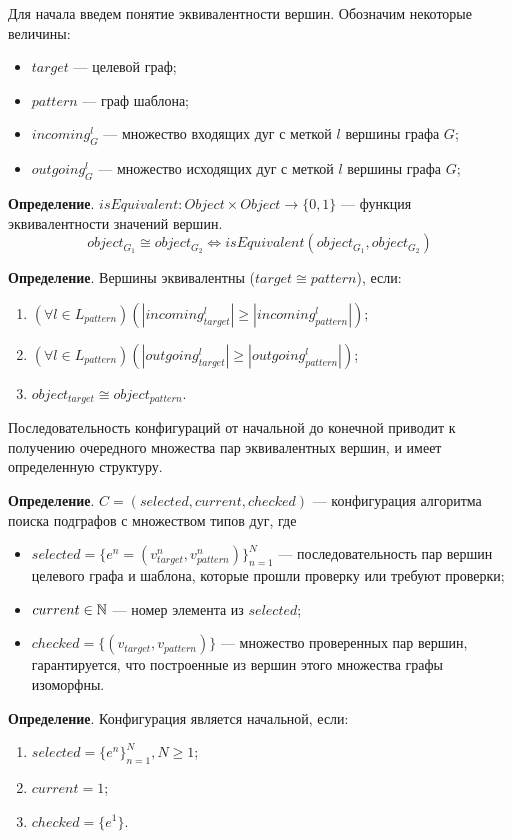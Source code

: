 Для начала введем понятие эквивалентности вершин.
Обозначим некоторые величины:
\begin{itemize}
\item $target$ --- целевой граф;
\item $pattern$ --- граф шаблона;
\item $incoming^{l}_G$ --- множество входящих дуг с меткой $l$ вершины графа $G$;
\item $outgoing^{l}_G$ --- множество исходящих дуг с меткой $l$ вершины графа $G$;
\end{itemize}

\textbf{Определение}. $isEquivalent: Object \times Object \to \{ 0, 1 \}$ ---
функция эквивалентности значений вершин.
%
$$object_{G_1} \cong object_{G_2} \iff isEquivalent(object_{G_1}, object_{G_2})$$

\textbf{Определение}. Вершины эквивалентны ($target \cong pattern $), если:
\begin{enumerate}
\item $( \forall l \in L_{pattern} ) ( |incoming^{l}_{target}| \ge |incoming^{l}_{pattern}| )$;
\item $( \forall l \in L_{pattern} ) ( |outgoing^{l}_{target}| \ge |outgoing^{l}_{pattern}| )$;
\item $object_{target} \cong object_{pattern}$.
\end{enumerate}

Последовательность конфигураций от начальной до конечной приводит к получению
очередного множества пар эквивалентных вершин, и имеет определенную структуру.

\textbf{Определение}. $C = ( selected, current, checked )$ --- конфигурация
алгоритма поиска подграфов с множеством типов дуг, где
\begin{itemize}
\item $selected = \{ e^n = ( v^n_{target}, v^n_{pattern} ) \}_{n=1}^N$ ---
последовательность пар вершин целевого графа и шаблона, которые прошли проверку
или требуют проверки;
\item $current \in \mathbb{N}$ --- номер элемента из $selected$;
\item $checked = \{ ( v_{target}, v_{pattern} ) \}$ --- множество проверенных
пар вершин, гарантируется, что построенные из вершин этого множества графы
изоморфны.
\end{itemize}

\textbf{Определение}. Конфигурация является начальной, если:
\begin{enumerate}
\item $selected = \{ e^n \}_{n=1}^N, N \ge 1$;
\item $current = 1$;
\item $checked = \{ e^1 \}$.
\end{enumerate}

